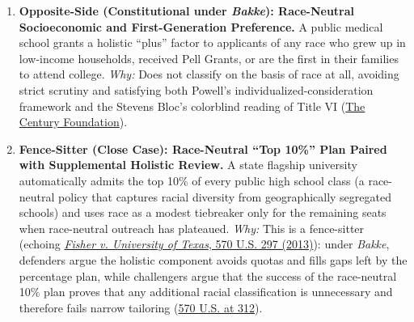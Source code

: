 \documentclass[12pt]{article}
\begin{document}
\begin{enumerate}
\item \textbf{Opposite-Side (Constitutional under \textit{Bakke}): Race-Neutral Socioeconomic and First-Generation Preference.} A public medical school grants a holistic ``plus'' factor to applicants of any race who grew up in low-income households, received Pell Grants, or are the first in their families to attend college. \textit{Why:} Does not classify on the basis of race at all, avoiding strict scrutiny and satisfying both Powell's individualized-consideration framework and the Stevens Bloc's colorblind reading of Title VI (\href{https://tcf.org/content/report/achieving-better-diversity/}{The Century Foundation}).

\item \textbf{Fence-Sitter (Close Case): Race-Neutral ``Top 10\%'' Plan Paired with Supplemental Holistic Review.} A state flagship university automatically admits the top 10\% of every public high school class (a race-neutral policy that captures racial diversity from geographically segregated schools) and uses race as a modest tiebreaker only for the remaining seats when race-neutral outreach has plateaued. \textit{Why:} This is a fence-sitter (echoing \href{https://supreme.justia.com/cases/federal/us/570/297/}{\textit{Fisher v. University of Texas}, 570 U.S. 297 (2013)}): under \textit{Bakke}, defenders argue the holistic component avoids quotas and fills gaps left by the percentage plan, while challengers argue that the success of the race-neutral 10\% plan proves that any additional racial classification is unnecessary and therefore fails narrow tailoring (\href{https://supreme.justia.com/cases/federal/us/570/297/}{570 U.S. at 312}).
\end{enumerate}
\end{document}
